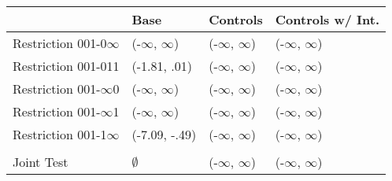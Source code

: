 \begin{tabular}{llll}
\toprule
{} &           Base &   Controls & Controls w/ Int. \\
\midrule
Restriction 001-0$\infty$ &      (-$\infty$, $\infty$) &  (-$\infty$, $\infty$) &        (-$\infty$, $\infty$) \\
Restriction 001-011 &   (-1.81, .01) &  (-$\infty$, $\infty$) &        (-$\infty$, $\infty$) \\
Restriction 001-$\infty$0 &      (-$\infty$, $\infty$) &  (-$\infty$, $\infty$) &        (-$\infty$, $\infty$) \\
Restriction 001-$\infty$1 &      (-$\infty$, $\infty$) &  (-$\infty$, $\infty$) &        (-$\infty$, $\infty$) \\
Restriction 001-1$\infty$ &  (-7.09, -.49) &  (-$\infty$, $\infty$) &        (-$\infty$, $\infty$) \\
\hline\\Joint Test  &         $\emptyset$ &  (-$\infty$, $\infty$) &        (-$\infty$, $\infty$) \\
\bottomrule
\end{tabular}
